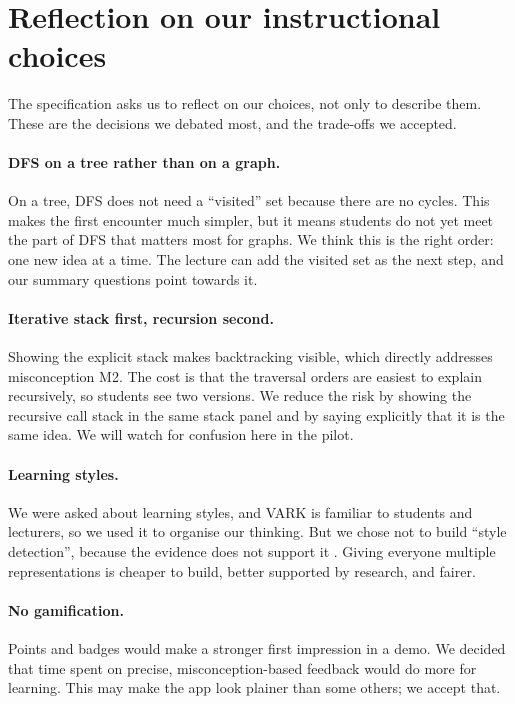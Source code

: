 \documentclass[11pt,a4paper]{article}
\begin{document}
\section{Reflection on our instructional choices}
\label{sec:reflect}

The specification asks us to reflect on our choices, not only to describe them. These are the
decisions we debated most, and the trade-offs we accepted.

\paragraph{DFS on a tree rather than on a graph.} On a tree, DFS does not need a ``visited'' set
because there are no cycles. This makes the first encounter much simpler, but it means students do
not yet meet the part of DFS that matters most for graphs. We think this is the right order: one
new idea at a time. The lecture can add the visited set as the next step, and our summary
questions point towards it.

\paragraph{Iterative stack first, recursion second.} Showing the explicit stack makes backtracking
visible, which directly addresses misconception M2. The cost is that the traversal orders are
easiest to explain recursively, so students see two versions. We reduce the risk by showing the
recursive call stack in the same stack panel and by saying explicitly that it is the same idea.
We will watch for confusion here in the pilot.

\paragraph{Learning styles.} We were asked about learning styles, and VARK is familiar to students
and lecturers, so we used it to organise our thinking. But we chose not to build ``style
detection'', because the evidence does not support it \cite{pashler2008}. Giving everyone multiple
representations is cheaper to build, better supported by research, and fairer.

\paragraph{No gamification.} Points and badges would make a stronger first impression in a demo.
We decided that time spent on precise, misconception-based feedback would do more for learning.
This may make the app look plainer than some others; we accept that.
\end{document}
